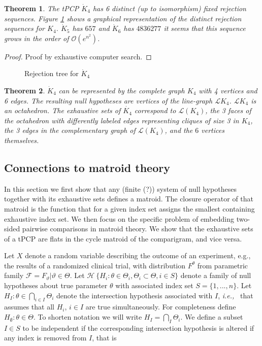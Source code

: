 \documentclass[a4paper,12pt]{article}
\newtheorem{theorem}{Theorem}
\newcommand{\ie}{{\em i.e.,}~}
\begin{document}
\begin{theorem}
  The tPCP $\dot{K}_4$ has 6 distinct (up to isomorphism) fixed
  rejection sequences. Figure \ref{fig:k4} shows a graphical
  representation of the distinct rejection sequences for
  $K_4$. $\dot{K}_5$ has $657$ and $\dot{K}_6$ has $4836277$ it seems
  that this sequence grows in the order of $\mathcal{O}(e^{n^2})$.
\end{theorem}

\begin{proof}
  Proof by exhaustive computer search.
\end{proof}

\begin{figure}

  \caption{Rejection tree for $\dot{K}_4$}
  \label{fig:k4}
\end{figure}

\begin{theorem}
  $\dot{K}_4$ can be represented by the complete graph $K_4$ with 4
  vertices and 6 edges. The resulting null hypotheses are vertices of
  the line-graph $\mathcal{L}{K_4}$. $\mathcal{L}{K_4}$ is an
  octahedron. The exhaustive sets of $\dot{K_4}$ correspond to
  $\mathcal{L}(K_4)$, the 3 faces of the octahedron with differently
  labeled edges representing cliques of size 3 in $K_4$, the 3 edges
  in the complementary graph of $\mathcal{L}(K_4)$, and the $6$
  vertices themselves.
\end{theorem}


\subsection{Connections to matroid theory}

In this section we first show that any (finite (?)) system of null
hypotheses together with its exhaustive sets defines a matroid. The
closure operator of that matroid is the function that for a given
index set assigns the smallest containing exhaustive index set. We
then focus on the specific problem of embedding two-sided pairwise
comparisons in matroid theory. We show that the exhaustive sets of a
tPCP are flats in the cycle matroid of the comparigram, and vice
versa. 


Let $X$ denote a random variable describing the outcome of an
experiment, e.g., the results of a randomized clinical trial, with
distribution $F^\theta$ from parametric family $\mathcal{F} =
{F_\vartheta|\vartheta \in \Theta}$. Let $\mathcal{H} \ \{H_i: \theta
\in \Theta_i, \Theta_i \subset \Theta, i \in S\}$ denote a family of
null hypotheses about true parameter $\theta$ with associated index
set $S = \{1,...,n\}$. Let $H_I : \theta \in \bigcap_{i \in I}
\Theta_i$ denote the intersection hypothesis associated with $I$, \ie
that assumes that all $H_i$, $i \in I$ are true simultaneously. For
completeness define $H_\emptyset : \theta \in \Theta$. To shorten
notation we will write $H_I = \bigcap_I \Theta_i$. We define a subset
$I \in S$ to be independent if the corresponding intersection
hypothesis is altered if any index is removed from $I$, that is
\end{document}
